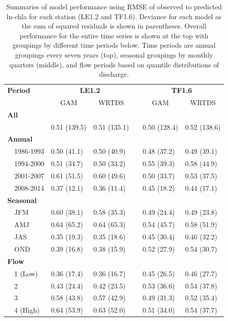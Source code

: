 \documentclass{svjour3}\usepackage[]{graphicx}\usepackage[]{color}
\begin{document}
\begin{table}[!tbp]
\caption{Summaries of model performance using \ac{RMSE} of observed to predicted ln-\ac{chla} for each station (LE1.2 and TF1.6).  Deviance for each model as the sum of squared residuals is shown in parentheses. Overall performance for the entire time series is shown at the top with groupings by different time periods below.  Time periods are annual groupings every seven years (top), seasonal groupings by monthly quarters (middle), and flow periods based on quantile distributions of discharge.\label{tab:perftoobs}} 
\begin{center}
\begin{tabular}{lllcll}
\hline\hline
\multicolumn{1}{l}{\bfseries Period}&\multicolumn{2}{c}{\bfseries LE1.2}&\multicolumn{1}{c}{\bfseries }&\multicolumn{2}{c}{\bfseries TF1.6}\tabularnewline
\cline{2-3} \cline{5-6}
\multicolumn{1}{l}{}&\multicolumn{1}{c}{GAM}&\multicolumn{1}{c}{WRTDS}&\multicolumn{1}{c}{}&\multicolumn{1}{c}{GAM}&\multicolumn{1}{c}{WRTDS}\tabularnewline
\hline
{\bfseries All}&&&&&\tabularnewline
~~&0.51 (139.5)&0.51 (135.1)&&0.50 (128.4)&0.52 (138.6)\tabularnewline
\hline
{\bfseries Annual}&&&&&\tabularnewline
~~1986-1993&0.50 (41.1)&0.50 (40.9)&&0.48 (37.2)&0.49 (39.1)\tabularnewline
~~1994-2000&0.51 (34.7)&0.50 (33.2)&&0.55 (39.3)&0.58 (44.9)\tabularnewline
~~2001-2007&0.61 (51.5)&0.60 (49.6)&&0.50 (33.7)&0.53 (37.5)\tabularnewline
~~2008-2014&0.37 (12.1)&0.36 (11.4)&&0.45 (18.2)&0.44 (17.1)\tabularnewline
\hline
{\bfseries Seasonal}&&&&&\tabularnewline
~~JFM&0.60 (38.1)&0.58 (35.3)&&0.49 (24.4)&0.49 (23.8)\tabularnewline
~~AMJ&0.64 (65.2)&0.64 (65.3)&&0.54 (45.7)&0.58 (51.9)\tabularnewline
~~JAS&0.35 (19.3)&0.35 (18.6)&&0.45 (30.4)&0.46 (32.2)\tabularnewline
~~OND&0.39 (16.8)&0.38 (15.9)&&0.52 (27.9)&0.54 (30.7)\tabularnewline
\hline
{\bfseries Flow}&&&&&\tabularnewline
~~1 (Low)&0.36 (17.4)&0.36 (16.7)&&0.45 (26.5)&0.46 (27.7)\tabularnewline
~~2&0.43 (24.4)&0.42 (23.5)&&0.53 (36.6)&0.54 (37.8)\tabularnewline
~~3&0.58 (43.8)&0.57 (42.9)&&0.49 (31.3)&0.52 (35.4)\tabularnewline
~~4 (High)&0.64 (53.9)&0.63 (52.0)&&0.51 (34.0)&0.54 (37.7)\tabularnewline
\hline
\end{tabular}\end{center}

\end{table}
\end{document}
